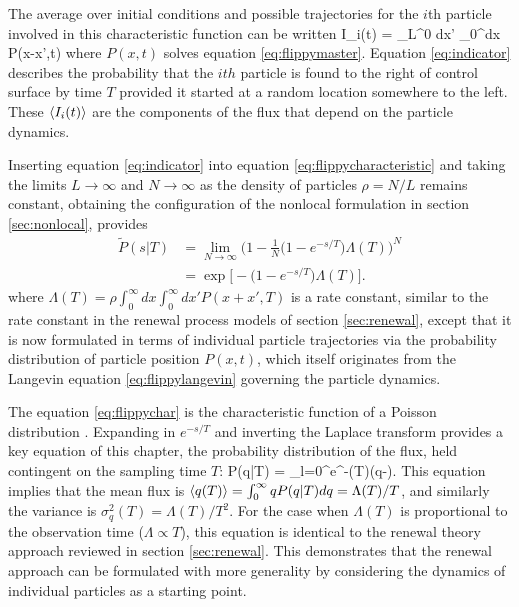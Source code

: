 The average over initial conditions and possible trajectories for the $i$th particle involved in this characteristic function can be written
\be \bra I_i(t) \ket = \int_L^0 dx' \int_0^\infty dx P(x-x',t) \label{eq:indicator} \ee
where $P(x,t)$ solves equation \ref{eq:flippymaster}.
Equation \ref{eq:indicator} describes the probability that the $ith$ particle is found to the right of control surface by time $T$ provided it started at a random location somewhere to the left.
These $\langle I_i(t) \rangle$ are the components of the flux that depend on the particle dynamics. 

Inserting equation \ref{eq:indicator} into equation \ref{eq:flippycharacteristic} and taking the limits $L\rightarrow \infty$ and $N \rightarrow \infty$ as the density of particles $\rho = N/L$ remains constant, obtaining the configuration of the nonlocal formulation in section \ref{sec:nonlocal}, provides
\begin{align} \tilde{P}(s|T) &= \lim_{N \rightarrow \infty} \Big(1 - \frac{1}{N}\big(1-e^{-s/T}\big)\Lambda(T) \Big)^N \\ &= \exp \Big[ -\big(1-e^{-s/T}\big)\Lambda(T) \Big]. \label{eq:flippychar} \end{align}
where $\Lambda(T) = \rho \int_0^\infty dx \int_0^\infty dx' P(x+x',T)$ is a rate constant, similar to the rate constant in the renewal process models of section \ref{sec:renewal}, except that it is now formulated in terms of individual particle trajectories via the probability distribution of particle position $P(x,t)$, which itself originates from the Langevin equation \ref{eq:flippylangevin} governing the particle dynamics.

The equation \ref{eq:flippychar} is the characteristic function of a Poisson distribution \citep{Cox1965}.
Expanding in $e^{-s/T}$ and inverting the Laplace transform provides a key equation of this chapter, the probability distribution of the flux, held contingent on the sampling time $T$:
\be P(q|T) = \sum_{l=0}^\infty {}e^{-\Lambda(T)}\delta(q-). \label{eq:flippydist}\ee
This equation implies that the mean flux is $\langle q(T) \rangle = \int_0^\infty q P(q|T) dq = \Lambda(T)/T$, and similarly the variance is $\sigma_q^2(T) = \Lambda(T)/T^2$. For the case when $\Lambda(T)$ is proportional to the observation time ($\Lambda \propto T$), this equation is identical to the renewal theory approach reviewed in section \ref{sec:renewal}.
This demonstrates that the renewal approach can be formulated with more generality by considering the dynamics of individual particles as a starting point.

